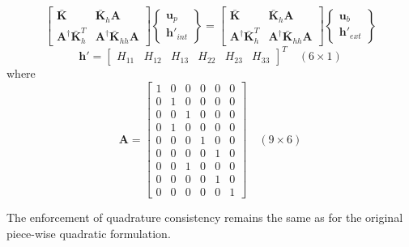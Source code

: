 \documentclass[11pt]{article} %
\begin{document}
\begin{equation}
	\left[ \begin{array}{cc} \bar{\mathbf{K}} & \bar{\mathbf{K}}_{h} \mathbf{A} \\ \mathbf{A}^{\dagger} \bar{\mathbf{K}}^T_{h} & \mathbf{A}^{\dagger} \bar{\mathbf{K}}_{hh} \mathbf{A} \end{array} \right] \left\{ \begin{array}{c} \mathbf{u}_p \\ \mathbf{h}'_{int} \end{array} \right\} = \left[ \begin{array}{cc} \bar{\mathbf{K}} & \bar{\mathbf{K}}_{h} \mathbf{A} \\ \mathbf{A}^{\dagger} \bar{\mathbf{K}}^T_{h} & \mathbf{A}^{\dagger} \bar{\mathbf{K}}_{hh} \mathbf{A} \end{array} \right] \left\{ \begin{array}{c} \mathbf{u}_b \\ \mathbf{h}'_{ext} \end{array} \right\}
\end{equation}
\begin{equation}
	\mathbf{h}' =  \left[ \begin{array}{cccccc} H_{11} & H_{12} & H_{13} & H_{22} & H_{23} & H_{33} \end{array} \right]^T \quad (6 \times 1)
\end{equation}
where
\begin{equation}
	\mathbf{A} =  \left[ \begin{array}{cccccc} 1 & 0 & 0 & 0 & 0 & 0 \\ 0 & 1 & 0 & 0 & 0 & 0 \\ 0 & 0 & 1 & 0 & 0 & 0 \\ 0 & 1 & 0 & 0 & 0 & 0 \\ 0 & 0 & 0 & 1 & 0 & 0 \\ 0 & 0 & 0 & 0 & 1 & 0 \\ 0 & 0 & 1 & 0 & 0 & 0 \\ 0 & 0 & 0 & 0 & 1 & 0 \\ 0 & 0 & 0 & 0 & 0 & 1 \end{array} \right] \quad (9 \times 6)
\end{equation}

The enforcement of quadrature consistency remains the same as for the original piece-wise quadratic formulation.
\end{document}
